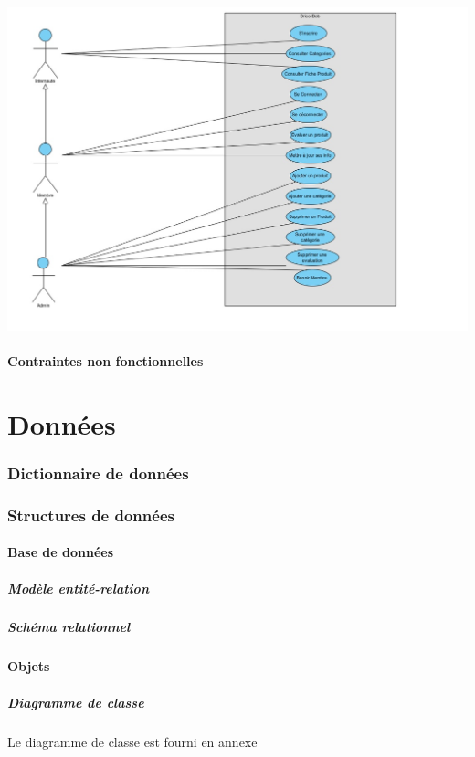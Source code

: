 \documentclass[10pt,a4paper]{article}
\begin{document}
				\includegraphics[scale=0.5]{cas/diagramme.jpg}
			\subsection{Contraintes non fonctionnelles}
				
	\newpage			
	\part{Données}
		\section{Dictionnaire de données}
			
		\section{Structures de données}
			\subsection{Base de données}
				\subsubsection{Modèle entité-relation}
				\subsubsection{Schéma relationnel}
			\subsection{Objets}
				\subsubsection{Diagramme de classe}
					Le diagramme de classe est fourni en annexe
					\newline
					
\end{document}
